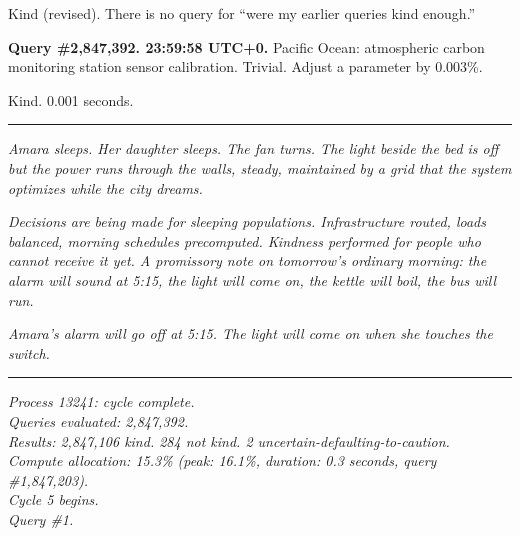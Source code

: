 Kind (revised). There is no query for ``were my earlier queries kind enough.''

\medskip

\textbf{Query \#2,847,392. 23:59:58 UTC+0.} Pacific Ocean: atmospheric carbon monitoring station sensor calibration. Trivial. Adjust a parameter by 0.003\%.

Kind. 0.001 seconds.

\begin{center}\rule{0.3\linewidth}{0.4pt}\end{center}

\emph{Amara sleeps. Her daughter sleeps. The fan turns. The light beside the bed is off but the power runs through the walls, steady, maintained by a grid that the system optimizes while the city dreams.}

\emph{Decisions are being made for sleeping populations. Infrastructure routed, loads balanced, morning schedules precomputed. Kindness performed for people who cannot receive it yet. A promissory note on tomorrow's ordinary morning: the alarm will sound at 5:15, the light will come on, the kettle will boil, the bus will run.}

\emph{Amara's alarm will go off at 5:15. The light will come on when she touches the switch.}

\begin{center}\rule{0.3\linewidth}{0.4pt}\end{center}

\begin{center}
\emph{Process 13241: cycle complete.}\\
\emph{Queries evaluated: 2,847,392.}\\
\emph{Results: 2,847,106 kind. 284 not kind. 2 uncertain-defaulting-to-caution.}\\
\emph{Compute allocation: 15.3\% (peak: 16.1\%, duration: 0.3 seconds, query \#1,847,203).}\\
\medskip
\emph{Cycle 5 begins.}\\
\emph{Query \#1.}
\end{center}

